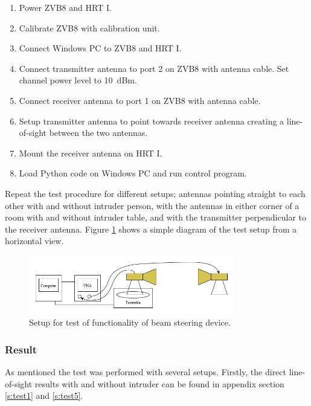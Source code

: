 \begin{enumerate}
    \item Power ZVB8 and HRT I. 
    \item Calibrate ZVB8 with calibration unit.
    \item Connect Windows PC to ZVB8 and HRT I.
    \item Connect transmitter antenna to port 2 on ZVB8 with antenna cable. Set channel power level to \SI{10}{dBm}.
    \item Connect receiver antenna to port 1 on ZVB8 with antenna cable.
    \item Setup transmitter antenna to point towards receiver antenna creating a line-of-sight between the two antennas. 
    \item Mount the receiver antenna on HRT I.
    \item Load Python code on Windows PC and run control program.
\end{enumerate}

Repeat the test procedure for different setups; antennas pointing straight to each other with and without intruder person, with the antennas in either corner of a room with and without intruder table, and with the transmitter perpendicular to the receiver antenna. Figure \ref{fig:experiment-setup} shows a simple diagram of the test setup from a horizontal view.

\begin{figure}[H]
    \centering
    \includegraphics[width=0.8\textwidth]{figures/accept_test_setup.png}
    \caption{Setup for test of functionality of beam steering device.} \label{fig:experiment-setup}
\end{figure}

\subsubsection{Result}
As mentioned the test was performed with several setups. Firstly, the direct line-of-sight results with and without intruder can be found in appendix section \ref{s:test1} and \ref{s:test5}. 

